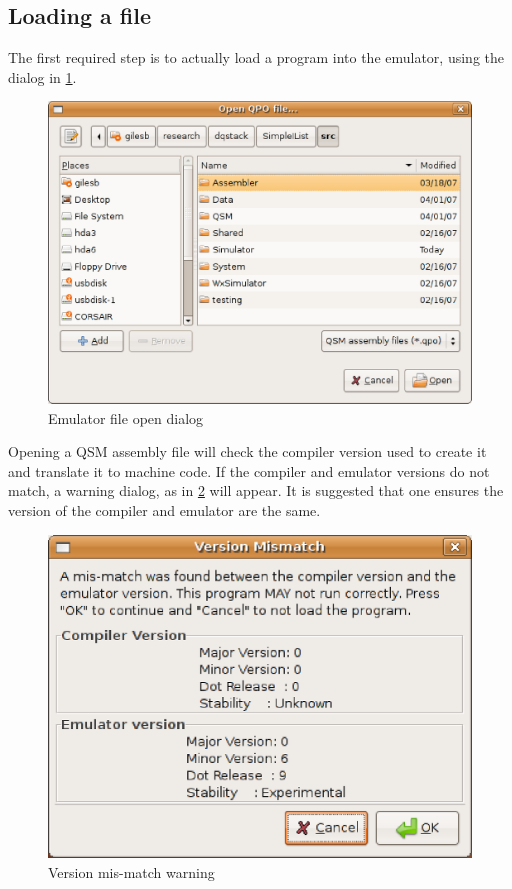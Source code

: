 \subsection{Loading a file}
The first required step is to actually load a program into the emulator,
using the  dialog in \ref{fig:emfileopen}.

\begin{figure}[htbp]
\centering
\includegraphics[scale=.5]{images/emulator/OpenDialog.eps}
\caption{Emulator file open dialog}\label{fig:emfileopen}
\end{figure}

Opening a QSM assembly file will check the compiler version
used to create it and translate it to machine code. If the compiler and
emulator versions do not match, a warning dialog, as
in \ref{fig:emversionmismatch} will appear. It is suggested that one
ensures the version of the compiler and emulator are the same.

\begin{figure}[htbp]
\centering
\includegraphics[scale=.5]{images/emulator/VersionMismatch.eps}
\caption{Version mis-match warning}\label{fig:emversionmismatch}
\end{figure}

